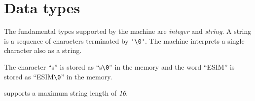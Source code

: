 \section{Data types}
The fundamental types supported by the machine are \textit{integer} and \textit{string}.
A string is a sequence of characters terminated by \verb|'\0'|. The machine interprets a single character also as a string.
\begin{example}
	The character ``s'' is stored as ``s\verb|\0|'' in the memory and the word ``ESIM'' is stored as ``ESIM\verb|\0|'' in the memory.
\end{example}
\ESIM supports a maximum string length of \emph{16}.
